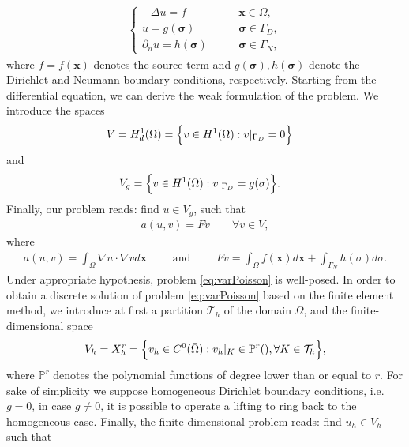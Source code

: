 \begin{align}
\begin{cases}
\nonumber
-\Delta u = f \qquad & \mathbf{x} \in \Omega,
\\  \label{eq:poisson}
u = g(\mathbf{\sigma}) \qquad & \mathbf{\sigma} \in \Gamma_D,
\\ \nonumber
\partial_n u = h(\mathbf{\sigma}) \qquad & \mathbf{\sigma} \in \Gamma_N,
\end{cases}
\end{align}
\noindent
where $ f = f(\mathbf{x}) $ denotes the source term and $  g(\mathbf{\sigma}), h(\mathbf{\sigma}) $ denote the Dirichlet and Neumann boundary conditions, respectively. Starting from the differential equation, we can derive the weak formulation of the problem. We introduce the spaces
\begin{align}
	V &= H^1_d(\Omega) = \Bigl\{ v \in H^1(\Omega): v|_{\Gamma_D} = 0 \Bigr\}
\end{align}
and
\begin{align}
	V_g &= \Bigl\{ v \in H^1(\Omega): v|_{\Gamma_D} = g(\sigma) \Bigr\}.
\end{align}
Finally, our problem reads: find $ u \in V_g $, such that  
\begin{align}\label{eq:varPoisson}
a(u, v) = Fv \qquad \forall v \in V,
\end{align}
where
\begin{align} 
	a(u, v) = \int_{\Omega} \nabla u \cdot \nabla v d\mathbf{x} \qquad 
	\text{ and } \qquad 
	Fv = \int_{\Omega} f(\mathbf{x}) d\mathbf{x} + \int_{\Gamma_N} h(\sigma) d\sigma.
\end{align}
Under appropriate hypothesis, problem \eqref{eq:varPoisson} is well-posed.
In order to obtain a discrete solution of problem \eqref{eq:varPoisson} based on the finite element method, we introduce at first a partition $ \mathcal{T}_h $ of the domain $ \Omega $, and the finite-dimensional space
\begin{align}
V_h = X_h^r = \Bigl\{ v_h \in C^0(\bar{\Omega}): v_h|_K \in \mathbb{P}^r(), \forall K \in \mathcal{T}_h \Bigr\},
\end{align}
where $ \mathbb{P}^r $ denotes the polynomial functions of degree lower than or equal to $ r $. For sake of simplicity we suppose homogeneous Dirichlet boundary conditions, i.e. $ g = 0 $, in case $ g \neq 0 $, it is possible to operate a lifting to ring back to the homogeneous case. 
\newline \noindent
Finally, the finite dimensional problem reads: find $ u_h \in V_h $ such that 
